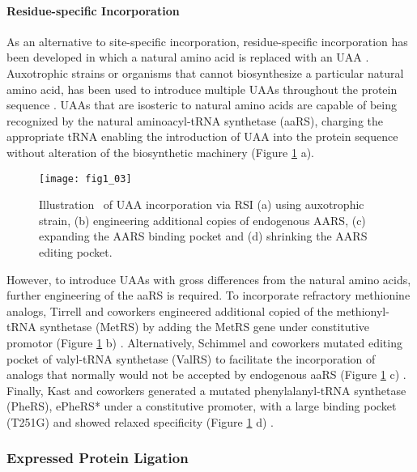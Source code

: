 \begin{refsection}
\paragraph{ Residue-specific Incorporation}
As an alternative to site-specific incorporation, residue-specific
incorporation has been developed in which a natural amino acid is replaced with
an UAA \cite{Wang2001}. Auxotrophic strains or organisms that cannot
biosynthesize a particular natural amino acid, has been used to introduce
multiple UAAs throughout the protein sequence \cite{Wang2001,Johnson2010}. UAAs
that are isosteric to natural amino acids are capable of being recognized by
the natural aminoacyl-tRNA synthetase (aaRS), charging the appropriate tRNA
enabling the introduction of UAA into the protein sequence without alteration
of the biosynthetic machinery (Figure \ref{fig:rsi} a).
\begin{figure}[htbp] \centering \texttt{[image: fig1\_03]} 
    \caption[Illustration  of UAA incorporation via RSI (a) using auxotrophic
    strain, (b) engineering additional copies of endogenous AARS, (c) expanding
the AARS binding pocket and (d) shrinking the AARS editing
pocket.]{Illustration  of UAA incorporation via RSI (a) using auxotrophic
strain, (b) engineering additional copies of endogenous AARS, (c) expanding the
AARS binding pocket and (d) shrinking the AARS editing pocket.} 
\label{fig:rsi} 
\end{figure}

However, to introduce UAAs with gross differences from the natural amino acids,
further engineering of the aaRS is required. To incorporate refractory
methionine analogs, Tirrell and coworkers engineered additional copied of the
methionyl-tRNA synthetase (MetRS) by adding the MetRS gene under constitutive
promotor (Figure \ref{fig:rsi} b) \cite{Kiick2000}.  Alternatively, Schimmel
and coworkers mutated editing pocket of valyl-tRNA synthetase (ValRS) to
facilitate the incorporation of analogs that normally would not be accepted by
endogenous aaRS (Figure \ref{fig:rsi} c) \cite{Doring2001}.  Finally, Kast and
coworkers generated a mutated phenylalanyl-tRNA synthetase (PheRS), ePheRS*
under a constitutive promoter, with a large binding pocket (T251G) and showed
relaxed specificity (Figure \ref{fig:rsi} d) \cite{Kast1991}.

\subsubsection{Expressed Protein Ligation}


\end{refsection}
